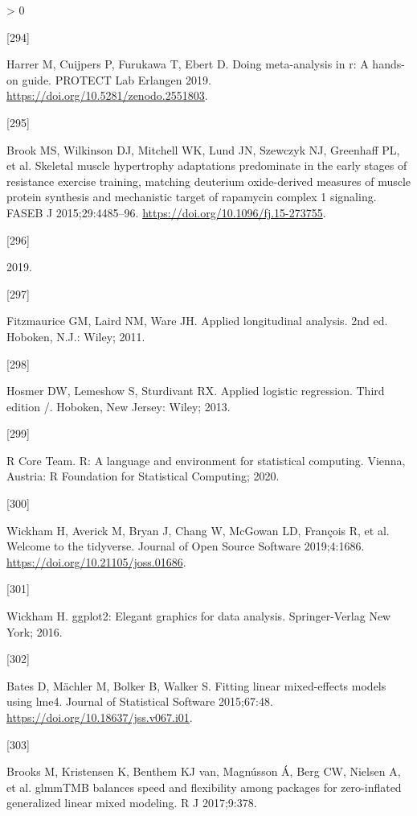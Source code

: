\documentclass[twoside,10pt]{gihclass} %
\newlength{\cslhangindent}
\newlength{\csllabelwidth}
\newenvironment{CSLReferences}[3] %
 {%
  \setlength{\parindent}{0pt}
  \ifodd #1 \everypar{\setlength{\hangindent}{\cslhangindent}}\ignorespaces\fi
  \ifnum #2 > 0
  \setlength{\parskip}{#2\baselineskip}
  \fi
 }%
 {}
\newcommand{\CSLLeftMargin}[1]{\parbox[t]{\maxof{\widthof{#1}}{\csllabelwidth}}{#1}}
\newcommand{\CSLRightInline}[1]{\parbox[t]{\linewidth}{#1}}
\begin{document}
\begin{CSLReferences}{0}{0}
\leavevmode\hypertarget{ref-harrer2019doing}{}%
\CSLLeftMargin{{[}294{]} }
\CSLRightInline{Harrer M, Cuijpers P, Furukawa T, Ebert D. Doing meta-analysis in r: A hands-on guide. PROTECT Lab Erlangen 2019. \url{https://doi.org/10.5281/zenodo.2551803}.}

\leavevmode\hypertarget{ref-RN1642}{}%
\CSLLeftMargin{{[}295{]} }
\CSLRightInline{Brook MS, Wilkinson DJ, Mitchell WK, Lund JN, Szewczyk NJ, Greenhaff PL, et al. Skeletal muscle hypertrophy adaptations predominate in the early stages of resistance exercise training, matching deuterium oxide-derived measures of muscle protein synthesis and mechanistic target of rapamycin complex 1 signaling. FASEB J 2015;29:4485--96. \url{https://doi.org/10.1096/fj.15-273755}.}

\leavevmode\hypertarget{ref-RN2822}{}%
\CSLLeftMargin{{[}296{]} }
\CSLRightInline{2019.}

\leavevmode\hypertarget{ref-RN2332}{}%
\CSLLeftMargin{{[}297{]} }
\CSLRightInline{Fitzmaurice GM, Laird NM, Ware JH. Applied longitudinal analysis. 2nd ed. Hoboken, N.J.: Wiley; 2011.}

\leavevmode\hypertarget{ref-RN1998}{}%
\CSLLeftMargin{{[}298{]} }
\CSLRightInline{Hosmer DW, Lemeshow S, Sturdivant RX. Applied logistic regression. Third edition /. Hoboken, New Jersey: Wiley; 2013.}

\leavevmode\hypertarget{ref-rtats}{}%
\CSLLeftMargin{{[}299{]} }
\CSLRightInline{R Core Team. R: A language and environment for statistical computing. Vienna, Austria: R Foundation for Statistical Computing; 2020.}

\leavevmode\hypertarget{ref-tidyverse}{}%
\CSLLeftMargin{{[}300{]} }
\CSLRightInline{Wickham H, Averick M, Bryan J, Chang W, McGowan LD, François R, et al. Welcome to the {tidyverse}. Journal of Open Source Software 2019;4:1686. \url{https://doi.org/10.21105/joss.01686}.}

\leavevmode\hypertarget{ref-ggplot2}{}%
\CSLLeftMargin{{[}301{]} }
\CSLRightInline{Wickham H. ggplot2: Elegant graphics for data analysis. Springer-Verlag New York; 2016.}

\leavevmode\hypertarget{ref-RN1819}{}%
\CSLLeftMargin{{[}302{]} }
\CSLRightInline{Bates D, Mächler M, Bolker B, Walker S. Fitting linear mixed-effects models using lme4. Journal of Statistical Software 2015;67:48. \url{https://doi.org/10.18637/jss.v067.i01}.}

\leavevmode\hypertarget{ref-RN2626}{}%
\CSLLeftMargin{{[}303{]} }
\CSLRightInline{Brooks M, Kristensen K, Benthem KJ van, Magnússon Á, Berg CW, Nielsen A, et al. glmmTMB balances speed and flexibility among packages for zero-inflated generalized linear mixed modeling. R J 2017;9:378.}


\end{CSLReferences}
\end{document}
